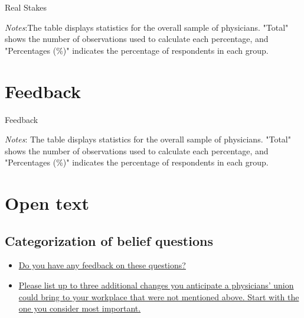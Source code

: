 \documentclass[11pt]{article}
\theoremstyle{definition}
\begin{document}
\begin{table}[H]
    \centering
    \caption{Real Stakes}
        \begin{adjustbox}{width=0.75\linewidth} 

\end{adjustbox}
     \parbox{\linewidth}{
        	\vspace{.2cm}
        		\scriptsize{\scriptsize{{\emph{Notes}:The table displays statistics for the overall sample of physicians. "Total" shows the number of observations used to calculate each percentage, and "Percentages (\%)" indicates the percentage of respondents in each group.}}}}
    \label{tab:stakes_table}
\end{table}

\clearpage

\section{Feedback}

\begin{table}[H]
    \centering
    \caption{Feedback}
        \begin{adjustbox}{width=0.45\linewidth}  

\end{adjustbox}
     \parbox{\linewidth}{
        	\vspace{.2cm}
        		\scriptsize{\scriptsize{{\emph{Notes}: The table displays statistics for the overall sample of physicians. "Total" shows the number of observations used to calculate each percentage, and "Percentages (\%)" indicates the percentage of respondents in each group.}}}}
    \label{tab:ai_table}
\end{table}

\clearpage

\section{Open text} 

\subsection{Categorization of belief questions}


    \begin{itemize}
        \item \href{https://www.dropbox.com/scl/fi/x5nio65ohv7o42dk6sc4i/feedback_belief_questions.csv?rlkey=cxxseve65x52cfwgaqtiqsoqa&dl=0}{Do you have any feedback on these questions?}
        \item \href{https://www.dropbox.com/scl/fi/unuuezlgufxpxlz3sxysk/open_text_other_beliefs.csv?rlkey=lioi0nr74mga9ylyxm0fjhlbk&dl=0}{Please list up to three additional changes you anticipate a physicians’ union could bring to your workplace that were not mentioned above. Start with the one you consider most important.}
    \end{itemize}
\end{document}
